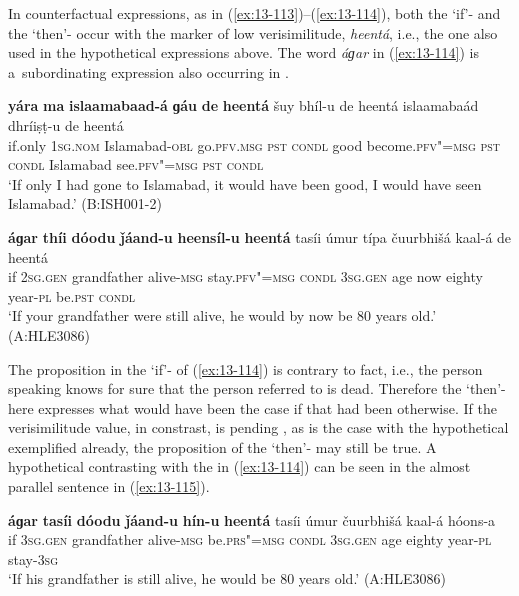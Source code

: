  In counterfactual expressions, as in (\ref{ex:13-113})--(\ref{ex:13-114}), both the `if'- and the `then'- occur with the  marker of low verisim\-il\-i\-tude, \textit{heentá}, i.e., the one also used in the hypothetical expressions above. The word \textit{áɡar} in (\ref{ex:13-114}) is a~subordinating expression also occurring in \iliUrdu {} \citep[101--103]{schmidt1999}.

\ea
\label{ex:13-113}
\gll \textbf{yára} \textbf{ma} \textbf{islaamabaad-á} \textbf{ɡáu} \textbf{de} \textbf{heentá} šuy bhíl-u de heentá islaamabaád  dhríiṣṭ-u de heentá\\
if.only \textsc{1sg.nom} Islamabad-\textsc{obl} go.\textsc{pfv.msg} \textsc{pst}  \textsc{condl} good become.\textsc{pfv"=msg} \textsc{pst} \textsc{condl} Islamabad see.\textsc{pfv"=msg} \textsc{pst} \textsc{condl}\\
\glt `If only I had gone to Islamabad, it would have been good, I would have seen Islamabad.' (B:ISH001-2)

\ex
\label{ex:13-114}
\gll \label{bkm:Ref190830564}\textbf{áɡar} \textbf{thíi} \textbf{dóodu} \textbf{ǰáand-u} \textbf{heensíl-u} \textbf{heentá} tasíi úmur típa čuurbhišá kaal-á de heentá\\
if \textsc{2sg.gen} grandfather alive-\textsc{msg} stay.\textsc{pfv"=msg}  \textsc{condl} 
\textsc{3sg.gen} age now eighty year-\textsc{pl} be.\textsc{pst} \textsc{condl} \\
\glt `If your grandfather were still alive, he would by now be 80 years old.' (A:HLE3086) 
\z

The proposition in the `if'- of (\ref{ex:13-114}) is contrary to fact, i.e., the person speaking knows for sure that the person referred to is dead. Therefore the `then'- here expresses what would have been the case if that had been otherwise. If the verisimilitude value, in constrast, is pending \citep[332]{givon2001b}, as is the case with the hypothetical  exemplified already, the proposition of the `then'- may still be true. A hypothetical  contrasting with the  in (\ref{ex:13-114}) can be seen in the almost parallel sentence in (\ref{ex:13-115}).

\begin{exe}
\ex
\label{ex:13-115}
\gll \textbf{áɡar} \textbf{tasíi} \textbf{dóodu} \textbf{ǰáand-u} \textbf{hín-u} \textbf{heentá} tasíi úmur čuurbhišá kaal-á hóons-a \\
if \textsc{3sg.gen} grandfather alive-\textsc{msg} be.\textsc{prs"=msg}  \textsc{condl} \textsc{3sg.gen} age eighty year-\textsc{pl} stay-\textsc{3sg} \\
\glt `If his grandfather is still alive, he would be 80 years old.' (A:HLE3086) 
\end{exe}

